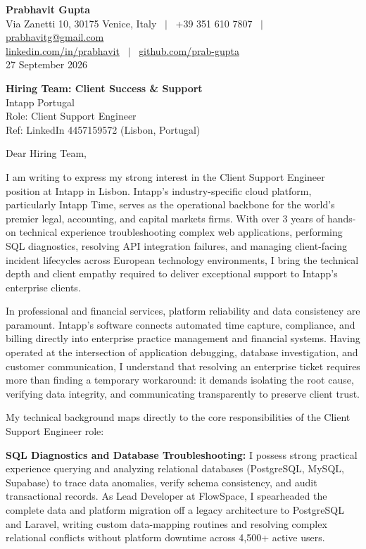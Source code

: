\documentclass[10.5pt,a4paper]{article}
\begin{document}
\textbf{\large Prabhavit Gupta}\\
Via Zanetti 10, 30175 Venice, Italy ~$\vert$~ +39 351 610 7807 ~$\vert$~ \href{mailto:prabhavitg@gmail.com}{prabhavitg@gmail.com}\\
\href{https://www.linkedin.com/in/prabhavit/}{linkedin.com/in/prabhavit} ~$\vert$~ \href{https://github.com/prab-gupta}{github.com/prab-gupta}\\
27 September 2026

\textbf{Hiring Team: Client Success \& Support}\\
Intapp Portugal\\
Role: Client Support Engineer\\
Ref: LinkedIn 4457159572 (Lisbon, Portugal)

Dear Hiring Team,

I am writing to express my strong interest in the Client Support Engineer position at Intapp in Lisbon. Intapp's industry-specific cloud platform, particularly Intapp Time, serves as the operational backbone for the world's premier legal, accounting, and capital markets firms. With over 3 years of hands-on technical experience troubleshooting complex web applications, performing SQL diagnostics, resolving API integration failures, and managing client-facing incident lifecycles across European technology environments, I bring the technical depth and client empathy required to deliver exceptional support to Intapp's enterprise clients.

In professional and financial services, platform reliability and data consistency are paramount. Intapp's software connects automated time capture, compliance, and billing directly into enterprise practice management and financial systems. Having operated at the intersection of application debugging, database investigation, and customer communication, I understand that resolving an enterprise ticket requires more than finding a temporary workaround: it demands isolating the root cause, verifying data integrity, and communicating transparently to preserve client trust.

My technical background maps directly to the core responsibilities of the Client Support Engineer role:

\textbf{SQL Diagnostics and Database Troubleshooting:} I possess strong practical experience querying and analyzing relational databases (PostgreSQL, MySQL, Supabase) to trace data anomalies, verify schema consistency, and audit transactional records. As Lead Developer at FlowSpace, I spearheaded the complete data and platform migration off a legacy architecture to PostgreSQL and Laravel, writing custom data-mapping routines and resolving complex relational conflicts without platform downtime across 4,500+ active users.
\end{document}
